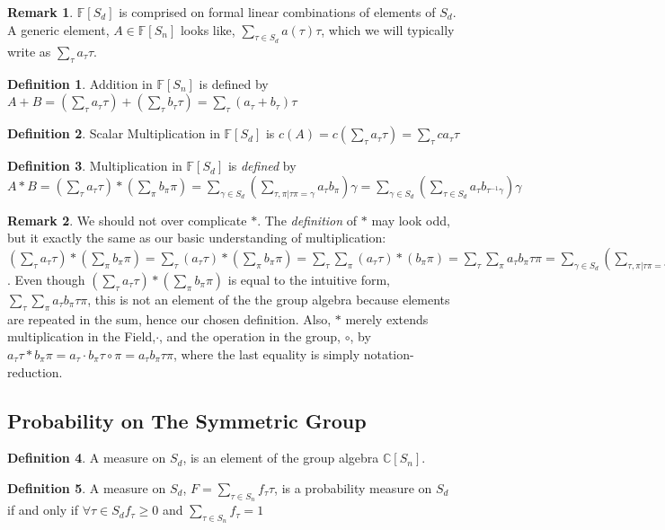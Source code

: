 \documentclass{article}
\theoremstyle{definition}
\newtheorem{definition}{Definition}
\newtheorem*{remark}{Remark}
\begin{document}
\begin{remark} $\mathbb{F}[S_d]$ is comprised on formal linear combinations of elements of $S_d$. A generic element, $A \in \mathbb{F}[S_n]$ looks like, $\sum_{\tau \in S_d} a(\tau)\tau$, which we will typically write as $\sum_\tau a_\tau \tau$. \end{remark}
\begin{definition}Addition in $\mathbb{F}[S_n]$ is defined by $A+B = (\sum_{\tau}a_{\tau}\tau) + (\sum_{\tau}b_{\tau}\tau) = \sum_{\tau} (a_{\tau}+b_{\tau})\tau $ \end{definition}
\begin{definition}Scalar Multiplication in $\mathbb{F}[S_d]$ is $c(A) = c(\sum_{\tau} a_\tau \tau)  = \sum_{\tau} ca_\tau \tau$\end{definition}
\begin{definition} Multiplication in $\mathbb{F}[S_d]$ is \textit{defined} by
$ A*B 
=(\sum_{\tau} a_\tau \tau)* (\sum_\pi b_\pi \pi)
=\sum_{\gamma \in S_d}(\sum_{  \tau,\pi | \tau\pi = \gamma  } a_\tau b_\pi) \gamma
= \sum_{\gamma \in S_d}(\sum_{  \tau \in S_d} a_\tau b_{\tau^{-1}\gamma} ) \gamma$ \end{definition}

\begin{remark} We should not over complicate $*$.
The \textit{definition} of $*$ may look odd, but it exactly the same as our basic understanding of multiplication: \(
(\sum_{  \tau} a_\tau\tau) *(\sum_{\pi }   b_\pi \pi)
= \sum_{  \tau} (a_\tau\tau) *(\sum_{\pi }   b_\pi \pi)
= \sum_{  \tau} \sum_{\pi }  (a_\tau\tau) * (b_\pi \pi)
= \sum_{  \tau}\sum_{\pi } a_\tau b_\pi \tau \pi
=\sum_{\gamma \in S_d}(\sum_{  \tau,\pi | \tau\pi = \gamma  } a_\tau b_\pi) \gamma
=(\sum_{\tau} a_\tau \tau)* (\sum_\pi b_\pi \pi)
\). Even though $(\sum_{  \tau} a_\tau\tau) *(\sum_{\pi }   b_\pi \pi)$ is equal to the intuitive form, $\sum_{  \tau}\sum_{\pi } a_\tau b_\pi \tau \pi $, this is not an element of the the group algebra because elements are repeated in the sum, hence our chosen definition. Also, $*$ merely extends multiplication in the Field,$\cdot$, and the operation in the group, $\circ $, by $a_\tau \tau * b_\pi \pi = a_\tau \cdot b_\pi \tau \circ\pi = a_\tau b_\pi \tau \pi$, where the last equality is simply notation-reduction. 
\end{remark}

\subsection{Probability on The Symmetric Group}
\begin{definition} A measure on $S_d$, is an element of the group algebra $\mathbb{C}[S_n]$.\end{definition}
\begin{definition} A measure on $S_d$, $F = \sum_{\tau \in S_n} f_\tau \tau $, is a probability measure on $S_d$ if and only if $\forall \tau \in S_d f_\tau \geq 0 $ and $\sum_{\tau \in S_n} f_\tau = 1 $
\end{definition}
\end{document}
